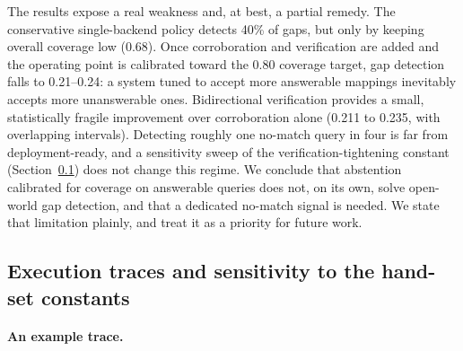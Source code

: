 \documentclass[a4paper,fleqn]{cas-sc}
\begin{document}
\begin{table}[htbp]
\caption{Open-world gap detection on the diagnostic benchmark (50\% of controls held out; mean $\pm$ 95\% CI over 30 seeds; 4.4 no-match queries per seed, 132 total). Gap detection is the abstention rate on constructed no-match queries, made by removing a requirement's gold controls.}
\label{tab:openworld}
\centering
\setlength{\tabcolsep}{3pt}
\small
{}
\end{table}

The results expose a real weakness and, at best, a partial remedy.
The conservative single-backend policy detects 40\% of gaps, but only by keeping overall coverage low (0.68).
Once corroboration and verification are added and the operating point is calibrated toward the 0.80 coverage target, gap detection falls to 0.21--0.24: a system tuned to accept more answerable mappings inevitably accepts more unanswerable ones.
Bidirectional verification provides a small, statistically fragile improvement over corroboration alone (0.211 to 0.235, with overlapping intervals).
Detecting roughly one no-match query in four is far from deployment-ready, and a sensitivity sweep of the verification-tightening constant (Section~\ref{sec:sensitivity}) does not change this regime.
We conclude that abstention calibrated for coverage on answerable queries does not, on its own, solve open-world gap detection, and that a dedicated no-match signal is needed. We state that limitation plainly, and treat it as a priority for future work.

\subsection{Execution traces and sensitivity to the hand-set constants}
\label{sec:sensitivity}

\paragraph{An example trace.}
\end{document}
